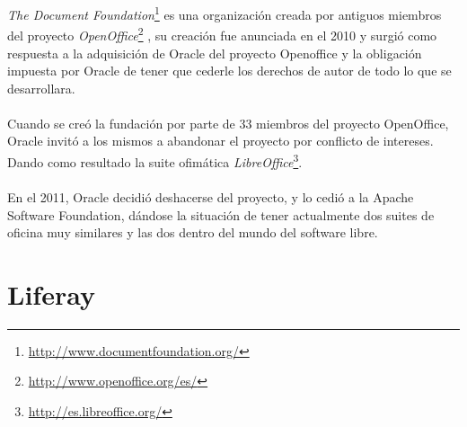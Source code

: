 \documentclass[a4paper,oneside,11pt]{article}
\begin{document}
\emph{The Document Foundation}\footnote{\url{http://www.documentfoundation.org/}} es una organizaci\'on creada por antiguos miembros del proyecto \emph{OpenOffice}\footnote{\url{http://www.openoffice.org/es/}} , su creaci\'on
fue anunciada en el 2010 y surgi\'o como respuesta a la adquisici\'on de Oracle del proyecto Openoffice y la
obligaci\'on impuesta por Oracle de tener que cederle los derechos de autor de todo lo que se desarrollara.
\\\\
Cuando se cre\'o la fundaci\'on por parte de 33 miembros del proyecto OpenOffice, Oracle invit\'o a los
mismos a abandonar el proyecto por conflicto de intereses. Dando como resultado la suite ofim\'atica \emph{LibreOffice}\footnote{\url{http://es.libreoffice.org/}}.
\\\\
En el 2011, Oracle decidi\'o deshacerse del proyecto, y lo cedi\'o a la Apache Software Foundation, d\'andose
la situaci\'on de tener actualmente dos suites de oficina muy similares y las dos dentro del mundo
del software libre.

\section{Liferay}
\end{document}
